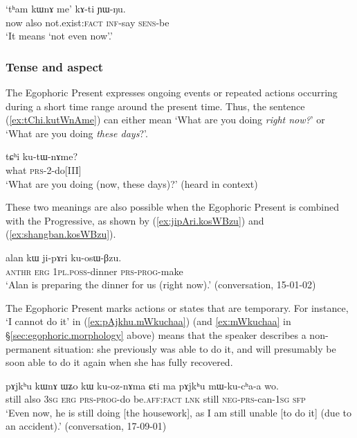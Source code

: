 \begin{exe}
	\ex \label{ex:tham.kWnA.me}
	\gll `tʰam kɯnɤ me' kɤ-ti ɲɯ-ŋu. \\
	now also not.exist:\textsc{fact} \textsc{inf}-say \textsc{sens}-be \\
	\glt `It means `not even now'.'
\end{exe}


\subsubsection{Tense and aspect} \label{sec:egophoric.tense}
The Egophoric Present expresses ongoing events or repeated actions occurring during a short time range around the present time. Thus, the sentence (\ref{ex:tChi.kutWnAme}) can either mean `What are you doing \textit{right now?}' or `What are you doing \textit{these days}?'.

\begin{exe}
\ex \label{ex:tChi.kutWnAme}
\gll tɕʰi ku-tɯ-nɤme? \\
what \textsc{prs}-2-do[III] \\
\glt `What are you doing (now, these days)?' (heard in context)
\end{exe}

These two meanings are also possible when the Egophoric Present is combined with the Progressive, as shown by (\ref{ex:jipAri.kosWBzu}) and (\ref{ex:shangban.kosWBzu}).

\begin{exe}
\ex \label{ex:jipAri.kosWBzu}
\gll alan kɯ ji-pɤri ku-osɯ-βzu. \\
\textsc{anthr} \textsc{erg} \textsc{1pl}.\textsc{poss}-dinner \textsc{prs}-\textsc{prog}-make \\
\glt `Alan is preparing the dinner for us (right now).' (conversation, 15-01-02)
\end{exe}

The Egophoric Present marks actions or states that are temporary. For instance,  `I cannot do it' in (\ref{ex:pAjkhu.mWkuchaa}) (and \ref{ex:mWkuchaa} in §\ref{sec:egophoric.morphology} above) means that the speaker describes a non-permanent situation: she previously was able to do it, and will presumably be soon able to do it again when she has fully recovered.

\begin{exe}
\ex \label{ex:pAjkhu.mWkuchaa}
\gll pɤjkʰu kɯnɤ ɯʑo kɯ ku-oz-nɤma ɕti ma pɤjkʰu mɯ-ku-cʰa-a wo. \\
still also \textsc{3sg} \textsc{erg} \textsc{prs}-\textsc{prog}-do be.\textsc{aff}:\textsc{fact} \textsc{lnk} still \textsc{neg}-\textsc{prs}-can-\textsc{1sg} \textsc{sfp} \\
\glt `Even now, he is still doing [the housework], as I am still unable [to do it] (due to an accident).' (conversation, 17-09-01)
\end{exe}

